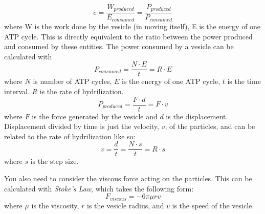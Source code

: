 \begin{equation}
e = \frac{W_{produced}}{E_{consumed}} = \frac{P_{produced}}{P_{consumed}}
\end{equation}
where W is the work done by the vesicle (in moving itself), E is the energy of one ATP cycle.
This is directly equivalent to the ratio between the power produced and consumed by these entities.
The power consumed by a vesicle can be calculated with
\begin{equation}
P_{consumed} = \frac{N \cdot E}{t} = R \cdot E
\end{equation}
where $N$ is number of ATP cycles, $E$ is the energy of one ATP cycle, $t$ is the time interval. $R$ is the rate of hydrilization.
\begin{equation}
P_{produced} = \frac{F \cdot d}{t} = F \cdot v
\end{equation}
where $F$ is the force generated by the vesicle and $d$ is the displacement.
Displacement divided by time is just the velocity, $v$, of the particles, and can be related to the rate of hydrilization like so:
\begin{equation}
v = \frac{d}{t} = \frac{N \cdot s}{t} = R \cdot s
\end{equation}
where $s$ is the step size.
\par
You also need to consider the viscous force acting on the particles. This can be calculated with \emph{Stoke's Law}, which takes the following form:
\begin{equation}
F_{viscous} = -6 \pi \mu r v
\end{equation}
where $\mu$ is the viscosity, $r$ is the vesicle radius, and $v$ is the speed of the vesicle.

